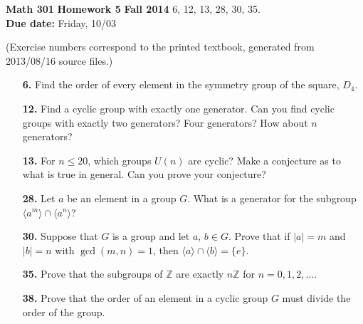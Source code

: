 \documentclass[12pt,reqno]{amsart}
\begin{document}
\thispagestyle{empty}

\noindent \textbf{Math 301} \hskip5cm {\bf Homework 5} \hfill {\bf Fall 2014}
\vskip1cm
  6, 12, 13, 28, 30, 35.\\  
{\bf Due date:} Friday, 10/03

\medskip

\noindent (Exercise numbers correspond to the printed textbook, generated from 2013/08/16 source files.)

\medskip

\begin{enumerate}

\item[{\bf 6.}]
Find the order of every element in the symmetry group of the square,
$D_4$.

\medskip 

\item[{\bf 12.}]
Find a cyclic group with exactly one generator.  Can you find cyclic
groups with exactly two generators?  Four generators?  How about $n$
generators?

\medskip 

\item[{\bf 13.}]
For $n \leq 20$, which groups $U(n)$ are cyclic?  Make a conjecture as
to what is true in general.  Can you prove your conjecture?  

\item[{\bf 28.}]
Let $a$ be an element in a group $G$. What is a generator for the
subgroup $\langle a^m \rangle  \cap  \langle a^n \rangle $?
 

\item[{\bf 30.}]
Suppose that $G$ is a group and let $a$, $b \in G$. Prove that if $|a|
= m$ and $|b| = n$ with $\gcd(m,n) = 1$, then $\langle a \rangle  \cap
\langle b \rangle  = \{ e \}$. 
 
\item[{\bf 35.}]
Prove that the subgroups of ${\mathbb Z}$ are exactly $n{\mathbb Z}$ for $n
= 0, 1, 2, \ldots$. 


\item[{\bf 38.}]
Prove that the order of an element in a cyclic group $G$ must divide
the order of the  group. 

\end{enumerate}
\end{document}
